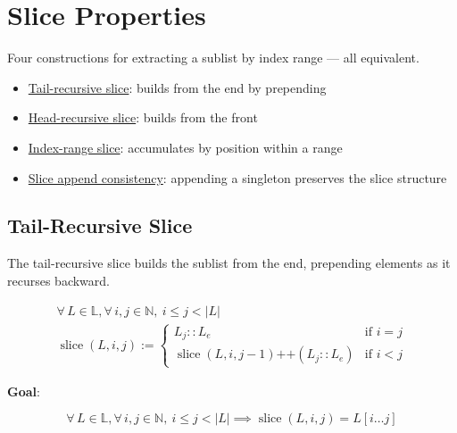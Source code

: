 \section{Slice Properties}
\label{sec:slice}

Four constructions for extracting a sublist by index range --- all
equivalent.

\begin{itemize}
  \item \href{https://github.com/thiagomata/prime-numbers/blob/list-article-v1.0.0/src/main/scala/v1/chapter3/list/ListUtils.scala}{Tail-recursive slice}:
    builds from the end by prepending
  \item \href{https://github.com/thiagomata/prime-numbers/blob/list-article-v1.0.0/src/main/scala/v1/chapter3/list/properties/SliceEquivalenceLemmas.scala}{Head-recursive slice}:
    builds from the front
  \item \href{https://github.com/thiagomata/prime-numbers/blob/list-article-v1.0.0/src/main/scala/v1/chapter3/list/properties/SliceEquivalenceLemmas.scala}{Index-range slice}:
    accumulates by position within a range
  \item \href{https://github.com/thiagomata/prime-numbers/blob/list-article-v1.0.0/src/main/scala/v1/chapter3/list/properties/ListUtilsProperties.scala}{Slice append consistency}:
    appending a singleton preserves the slice structure
\end{itemize}

\subsection{Tail-Recursive Slice}

The tail-recursive slice builds the sublist from the end, prepending
elements as it recurses backward.

\begin{gather*}
\forall\, L \in \mathbb{L}, \forall\, i, j \in \mathbb{N},\ i \leq j < |L| \\
\operatorname{slice}(L, i, j) :=
\begin{cases}
L_j :: L_e & \text{if } i = j \\
\operatorname{slice}(L, i, j - 1) \mathbin{\texttt{++}} (L_j :: L_e) & \text{if } i < j
\end{cases}
\end{gather*}

\textbf{Goal}:\par\nopagebreak

\begin{equation*}
\forall\, L \in \mathbb{L}, \forall\, i, j \in \mathbb{N},\ i \leq j < |L| \implies \operatorname{slice}(L, i, j) = L[i \dots j]
\end{equation*}

